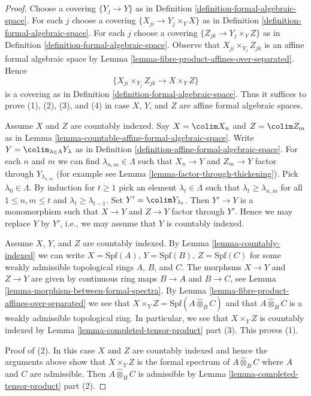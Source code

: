 \begin{proof}
Choose a covering $\{Y_j \to Y\}$ as in
Definition \ref{definition-formal-algebraic-space}.
For each $j$ choose a covering $\{X_{ji} \to Y_j \times_Y X\}$
as in Definition \ref{definition-formal-algebraic-space}.
For each $j$ choose a covering $\{Z_{jk} \to Y_j \times_Y Z\}$
as in Definition \ref{definition-formal-algebraic-space}.
Observe that $X_{ji} \times_{Y_j} Z_{jk}$ is an
affine formal algebraic space by
Lemma \ref{lemma-fibre-product-affines-over-separated}.
Hence
$$
\{X_{ji} \times_{Y_j} Z_{jk} \to X \times_Y Z\}
$$
is a covering as in Definition \ref{definition-formal-algebraic-space}.
Thus it suffices to prove (1), (2), (3), and (4) in case $X$, $Y$, and $Z$
are affine formal algebraic spaces.

\medskip\noindent
Assume $X$ and $Z$ are countably indexed. Say $X = \colim X_n$ and
$Z = \colim Z_m$ as in
Lemma \ref{lemma-countable-affine-formal-algebraic-space}.
Write $Y = \colim_{\lambda \in \Lambda} Y_\lambda$ as in
Definition \ref{definition-affine-formal-algebraic-space}.
For each $n$ and $m$ we can find $\lambda_{n, m} \in \Lambda$
such that $X_n \to Y$ and $Z_m \to Y$ factor through $Y_{\lambda_{n, m}}$
(for example see Lemma \ref{lemma-factor-through-thickening}).
Pick $\lambda_0 \in \Lambda$. By induction for $t \geq 1$
pick an element $\lambda_t \in \Lambda$ such that
$\lambda_t \geq \lambda_{n, m}$ for all $1 \leq n, m \leq t$
and $\lambda_t \geq \lambda_{t - 1}$. Set $Y' = \colim Y_{\lambda_t}$.
Then $Y' \to Y$ is a monomorphism such that $X \to Y$ and $Z \to Y$
factor through $Y'$. Hence we may replace $Y$ by $Y'$, i.e.,
we may assume that $Y$ is countably indexed.

\medskip\noindent
Assume $X$, $Y$, and $Z$ are countably indexed. By
Lemma \ref{lemma-countably-indexed} we can write
$X = \text{Spf}(A)$, $Y = \text{Spf}(B)$, $Z = \text{Spf}(C)$
for some weakly admissible topological rings $A$, $B$, and $C$.
The morphsms $X \to Y$ and $Z \to Y$ are given by
continuous ring maps $B \to A$ and $B \to C$, see
Lemma \ref{lemma-morphism-between-formal-spectra}.
By Lemma \ref{lemma-fibre-product-affines-over-separated}
we see that $X \times_Y Z = \text{Spf}(A \widehat{\otimes}_B C)$
and that $A \widehat{\otimes}_B C$ is a weakly admissible topological ring.
In particular, we see that $X \times_Y Z$ is countably indexed
by Lemma \ref{lemma-completed-tensor-product} part (3).
This proves (1).

\medskip\noindent
Proof of (2). In this case $X$ and $Z$ are countably indexed and
hence the arguments above show that $X \times_Y Z$ is the formal spectrum
of $A \widehat{\otimes}_B C$ where $A$ and $C$ are admissible.
Then $A \widehat{\otimes}_B C$ is admissible by 
Lemma \ref{lemma-completed-tensor-product} part (2).


\end{proof}
